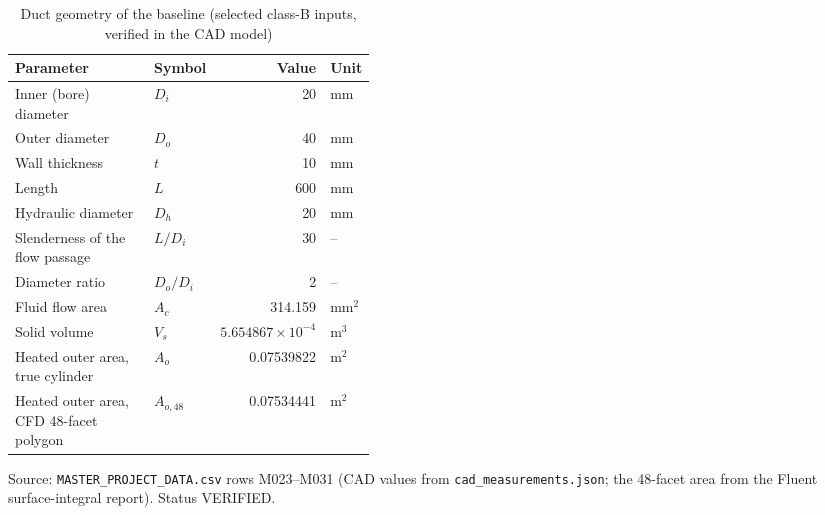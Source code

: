 \begin{table}[htbp]
\centering
\small
\caption{Duct geometry of the baseline (selected class-B inputs, verified in the CAD model)}
\label{tab:geometry}
\begin{tabular}{>{\raggedright\arraybackslash}p{0.42\linewidth}lrl}
\toprule
Parameter & Symbol & Value & Unit \\
\midrule
Inner (bore) diameter & $D_i$ & 20 & mm \\
Outer diameter & $D_o$ & 40 & mm \\
Wall thickness & $t$ & 10 & mm \\
Length & $L$ & 600 & mm \\
Hydraulic diameter & $D_h$ & 20 & mm \\
Slenderness of the flow passage & $L/D_i$ & 30 & -- \\
Diameter ratio & $D_o/D_i$ & 2 & -- \\
Fluid flow area & $A_c$ & 314.159 & mm$^2$ \\
Solid volume & $V_s$ & $5.654867\times10^{-4}$ & m$^3$ \\
Heated outer area, true cylinder & $A_o$ & 0.07539822 & m$^2$ \\
Heated outer area, CFD 48-facet polygon & $A_{o,48}$ & 0.07534441 & m$^2$ \\
\bottomrule
\end{tabular}
\par\smallskip\parbox{\linewidth}{\footnotesize\raggedright Source: \texttt{MASTER\_PROJECT\_DATA.csv} rows M023--M031 (CAD values from \texttt{cad\_measurements.json}; the 48-facet area from the Fluent surface-integral report). Status VERIFIED.}
\end{table}

